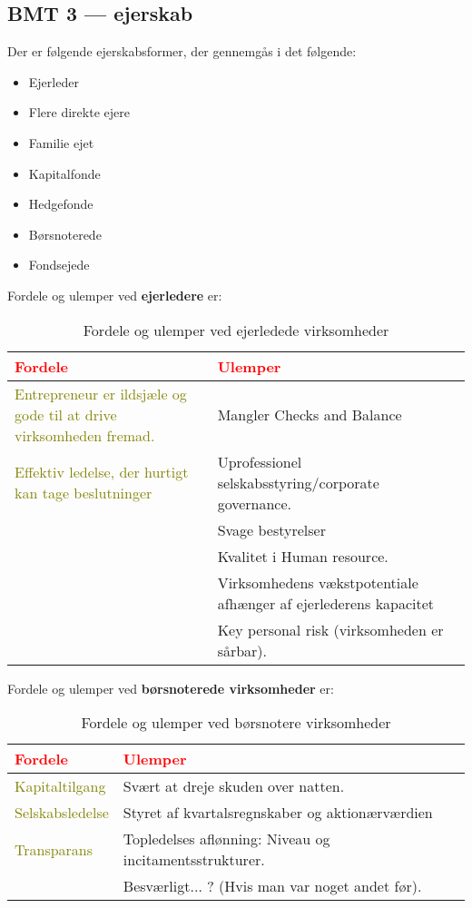 \documentclass[10pt,reqno, usenames]{article}
\begin{document}
\subsection{BMT 3 — ejerskab}
Der er følgende ejerskabsformer, der gennemgås i det følgende: 

\begin{itemize}
    \item Ejerleder
    \item Flere direkte ejere 
    \item Familie ejet
    \item Kapitalfonde
    \item Hedgefonde
    \item Børsnoterede
    \item Fondsejede
\end{itemize}

Fordele og ulemper ved \textbf{ejerledere} er:

\begin{table}[h!]
\centering
\begin{tabular}{|m{5cm}|m{5cm}|}
\hline
\textbf{\textcolor{red}{Fordele}} & \textbf{\textcolor{red}{Ulemper}} \\
\hline
\textcolor{olive}{Entrepreneur er ildsjæle og gode til at drive virksomheden fremad.} & Mangler Checks and Balance \\
\hline
\textcolor{olive}{Effektiv ledelse, der hurtigt kan tage beslutninger} & Uprofessionel selskabsstyring/corporate governance. \\
\hline
 & Svage bestyrelser \\
\hline
 & Kvalitet i Human resource. \\
\hline
 & Virksomhedens vækstpotentiale afhænger af ejerlederens kapacitet \\
\hline
 & Key personal risk (virksomheden er sårbar). \\
\hline
\end{tabular}
\caption{Fordele og ulemper ved ejerledede virksomheder}
\end{table}

Fordele og ulemper ved \textbf{børsnoterede virksomheder} er:

\begin{table}[h!]
\centering
\begin{tabular}{|m{5cm}|m{5cm}|}
\hline
\centering \textbf{\textcolor{red}{Fordele}} & \centering \textbf{\textcolor{red}{Ulemper}} \tabularnewline
\hline
\textcolor{olive}{Kapitaltilgang} & Svært at dreje skuden over natten. \tabularnewline
\hline
\textcolor{olive}{Selskabsledelse} & Styret af kvartalsregnskaber og aktionærværdien \tabularnewline
\hline
\textcolor{olive}{Transparans} & Topledelses aflønning: Niveau og incitamentsstrukturer. \tabularnewline
\hline
& Besværligt... ? (Hvis man var noget andet før). \tabularnewline
\hline
\end{tabular}
\caption{Fordele og ulemper ved børsnotere virksomheder}
\end{table}
\end{document}
